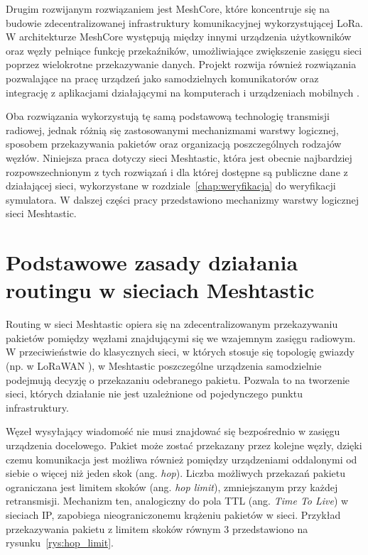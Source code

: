 \documentclass[12pt,a4paper,twoside]{report}
\theoremstyle{definition} %
\begin{document}
    Drugim rozwijanym rozwiązaniem jest MeshCore, które koncentruje się na budowie zdecentralizowanej infrastruktury komunikacyjnej wykorzystującej LoRa. W architekturze MeshCore występują między innymi urządzenia użytkowników oraz węzły pełniące funkcję przekaźników, umożliwiające zwiększenie zasięgu sieci poprzez wielokrotne przekazywanie danych. Projekt rozwija również rozwiązania pozwalające na pracę urządzeń jako samodzielnych komunikatorów oraz integrację z aplikacjami działającymi na komputerach i urządzeniach mobilnych \cite{meshcore}.
    
    Oba rozwiązania wykorzystują tę samą podstawową technologię transmisji radiowej, jednak różnią się zastosowanymi mechanizmami warstwy logicznej, sposobem przekazywania pakietów oraz organizacją poszczególnych rodzajów węzłów. Niniejsza praca dotyczy sieci Meshtastic, która jest obecnie najbardziej rozpowszechnionym z tych rozwiązań i dla której dostępne są publiczne dane z działającej sieci, wykorzystane w rozdziale~\ref{chap:weryfikacja} do weryfikacji symulatora. W dalszej części pracy przedstawiono mechanizmy warstwy logicznej sieci Meshtastic.
    
    \section{Podstawowe zasady działania routingu w sieciach Meshtastic}

    Routing w sieci Meshtastic opiera się na zdecentralizowanym przekazywaniu pakietów pomiędzy węzłami znajdującymi się we wzajemnym zasięgu radiowym. W przeciwieństwie do klasycznych sieci, w których stosuje się topologię gwiazdy (np. w LoRaWAN \cite{lorawan104}), w Meshtastic poszczególne urządzenia samodzielnie podejmują decyzję o przekazaniu odebranego pakietu. Pozwala to na tworzenie sieci, których działanie nie jest uzależnione od pojedynczego punktu infrastruktury.
    
    Węzeł wysyłający wiadomość nie musi znajdować się bezpośrednio w zasięgu urządzenia docelowego. Pakiet może zostać przekazany przez kolejne węzły, dzięki czemu komunikacja jest możliwa również pomiędzy urządzeniami oddalonymi od siebie o więcej niż jeden skok (ang. \textit{hop}). Liczba możliwych przekazań pakietu ograniczana jest limitem skoków (ang. \textit{hop limit}), zmniejszanym przy każdej retransmisji. Mechanizm ten, analogiczny do pola TTL (ang. \textit{Time To Live}) w sieciach IP, zapobiega nieograniczonemu krążeniu pakietów w sieci. Przykład przekazywania pakietu z limitem skoków równym 3 przedstawiono na rysunku~\ref{rys:hop_limit}.
\end{document}
